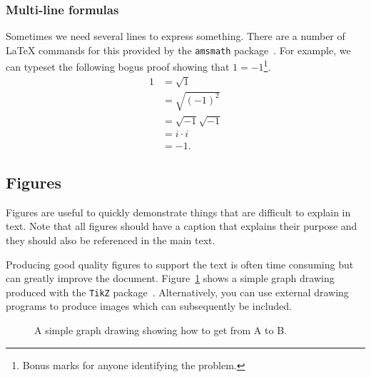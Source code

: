 \documentclass[12pt]{article}
\theoremstyle{plain}
\theoremstyle{definition}
\begin{document}
\subsubsection{Multi-line formulas}

Sometimes we need several lines to express something. There are a
number of LaTeX commands for this provided by the \verb|amsmath|
package~\cite{ctan-amsmath}. For example, we can typeset the following
bogus proof showing that \(1 = -1\)\footnote{Bonus marks for anyone
  identifying the problem.}.
\begin{align*}
  1 &= \sqrt 1\\
    &= \sqrt{(-1)^2}\\
    &= \sqrt{-1}\sqrt{-1}\\
    &= i\cdot i\\
    &= -1.
\end{align*}

\subsection{Figures}
\label{sec:typesetting_figures}

Figures are useful to quickly demonstrate things that are difficult to
explain in text. Note that all figures should have a caption that
explains their purpose and they should also be referenced in the main
text.

Producing good quality figures to support the text is often time
consuming but can greatly improve the document. Figure~\ref{fig:atob}
shows a simple graph drawing produced with the \verb|TikZ|
package~\cite{tikz}. Alternatively, you can use external drawing
programs to produce images which can subsequently be included.

\begin{figure}[ht]
  \centering
  \caption[A simple graph drawing]{A simple graph drawing showing how
    to get from A to B.}
  \label{fig:atob}
\end{figure}
\end{document}
